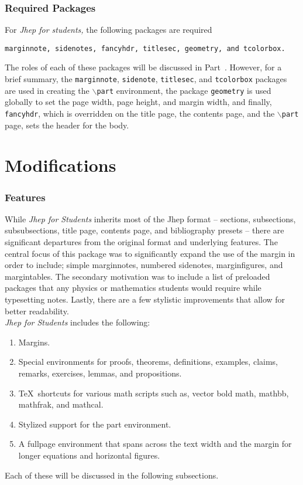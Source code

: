 \documentclass[10pt]{article}
\begin{document}
	\section{Required Packages}\label{Sec: Required Packages}
	For \textit{Jhep for students,} the following packages are required
	\begin{center}
		\texttt{marginnote, sidenotes, fancyhdr, titlesec, geometry, and tcolorbox.}
	\end{center}
	The roles of each of these packages will be discussed in Part~\ref{Part:Modification}. However, for a brief summary, the \texttt{marginnote}, \texttt{sidenote}, \texttt{titlesec}, and \texttt{tcolorbox} packages are used in creating the \texttt{$\backslash$part} environment, the package \texttt{geometry} is used globally to set the page width, page height, and margin width, and finally, \texttt{fancyhdr}, which is overridden on the title page, the contents page, and the \texttt{$\backslash$part} page, sets the header for the body.

	\part{Modifications}\label{Part:Modification}
	\section{Features}\label{Sub:Features}
	While \textit{Jhep for Students} inherits most of the Jhep format -- sections, subsections, subsubsections, title page, contents page, and bibliography presets -- there are significant departures from the original format and underlying features. The central focus of this package was to significantly expand the use of the margin in order to include; simple marginnotes, numbered sidenotes, marginfigures, and margintables. The secondary motivation was to include a list of preloaded packages that any physics or mathematics students would require while typesetting notes. Lastly, there are a few stylistic improvements that allow for better readability.\\

	\noindent \textit{Jhep for Students} includes the following:
	\begin{enumerate}
		\item Margins.
		\item Special environments for proofs, theorems, definitions, examples, claims, remarks, exercises, lemmas, and propositions.
		\item \TeX\ shortcuts for various math scripts such as, vector bold math, mathbb, mathfrak, and mathcal.
		\item Stylized support for the part environment.
		\item A fullpage environment that spans across the text width and the margin for longer equations and horizontal figures.
	\end{enumerate}
	Each of these will be discussed in the following subsections.
\end{document}
